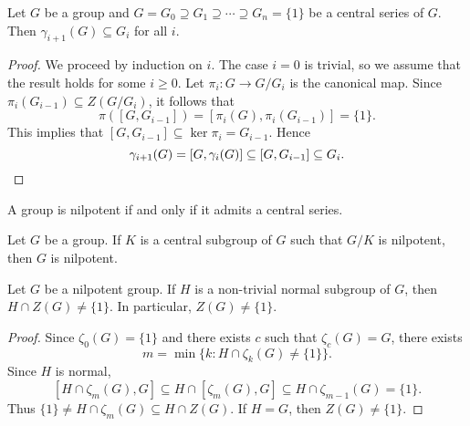 \begin{proposition}
	\label{pro:serie_central}
	Let $G$ be a group and $G=G_0\supseteq G_1\supseteq\cdots\supseteq G_n=\{1\}$
	be a central series of $G$. Then $\gamma_{i+1}(G)\subseteq G_i$ for all $i$.
\end{proposition}

\begin{proof}
	We proceed by induction on $i$. 
	The case $i=0$ is trivial, so we assume that 
	the result holds for some 
	$i\geq0$. 
	Let $\pi_i\colon G\to G/G_i$ is the canonical map. 
	Since $\pi_i(G_{i-1})\subseteq Z(G/G_{i})$, it follows that
	\[
	\pi([G,G_{i-1}])=[\pi_i(G),\pi_i(G_{i-1})]=\{1\}.
	\]
	This implies that $[G,G_{i-1}]\subseteq\ker\pi_i=G_{i-1}$. Hence
	\[
	\gamma_{i+1}(G)=[G,\gamma_i(G)]\subseteq [G,G_{i-1}]\subseteq G_i.\qedhere 
	\]
\end{proof}


\begin{exercise}
	A group is nilpotent if and only if it admits a central series.
\end{exercise}


\begin{exercise}
\label{xca:nilpotente_central}
	Let $G$ be a group. If $K$ is a central subgroup of $G$ such that 
	$G/K$ is nilpotent, then $G$ is nilpotent.
\end{exercise}

\begin{theorem}[Hirsch]
	\label{thm:Z(nilpotent)}
	Let $G$ be a nilpotent group. If $H$ is a non-trivial normal subgroup of $G$, then 
	$H\cap Z(G)\ne\{1\}$. In particular, $Z(G)\ne\{1\}$. 
\end{theorem}

\begin{proof}
	Since $\zeta_0(G)=\{1\}$ and there exists $c$ such that $\zeta_c(G)=G$, there exists  
	\[
	m=\min\{k:H\cap\zeta_k(G)\ne\{1\}\}.
	\]
	Since $H$ is normal, 
	\[
	[H\cap\zeta_m(G),G]\subseteq H\cap[\zeta_m(G),G]\subseteq H\cap\zeta_{m-1}(G)=\{1\}.
	\]
	Thus $\{1\}\ne H\cap\zeta_m(G)\subseteq H\cap Z(G)$. If $H=G$, then $Z(G)\ne\{1\}$. 
\end{proof}


